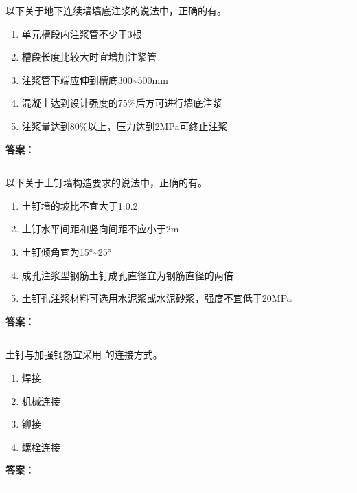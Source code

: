 \documentclass[UTF8,fontset=fandol,11pt]{ctexart}
\newcommand{\answerline}{\textcolor{answerred}{\rule{2.4cm}{0.7pt}}}
\begin{document}
\begin{quizbox}[title={第 7 题}]
以下关于地下连续墙墙底注浆的说法中，正确的有。\\
\begin{enumerate}[label=\Alph*.]
\item 单元槽段内注浆管不少于3根
\item 槽段长度比较大时宜增加注浆管
\item 注浆管下端应伸到槽底300\textasciitilde{}500mm
\item 混凝土达到设计强度的75\%后方可进行墙底注浆
\item 注浆量达到80\%以上，压力达到2MPa可终止注浆
\end{enumerate}
\textbf{\textcolor{answerred}{答案：}} \answerline
\end{quizbox}

\vspace{0.2em}

\begin{quizbox}[title={第 8 题}]
以下关于土钉墙构造要求的说法中，正确的有。\\
\begin{enumerate}[label=\Alph*.]
\item 土钉墙的坡比不宜大于1:0.2
\item 土钉水平间距和竖向间距不应小于2m
\item 土钉倾角宜为15°\textasciitilde{}25°
\item 成孔注浆型钢筋土钉成孔直径宜为钢筋直径的两倍
\item 土钉孔注浆材料可选用水泥浆或水泥砂浆，强度不宜低于20MPa
\end{enumerate}
\textbf{\textcolor{answerred}{答案：}} \answerline
\end{quizbox}

\vspace{0.2em}

\begin{quizbox}[title={第 9 题}]
土钉与加强钢筋宜采用 的连接方式。\\
\begin{enumerate}[label=\Alph*.]
\item 焊接
\item 机械连接
\item 铆接
\item 螺栓连接
\end{enumerate}
\textbf{\textcolor{answerred}{答案：}} \answerline
\end{quizbox}

\vspace{0.2em}
\end{document}
